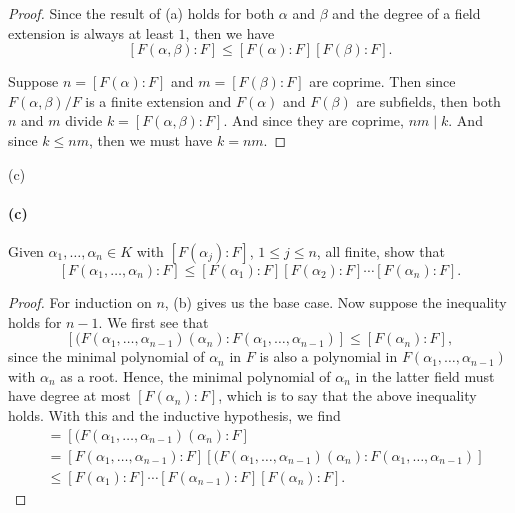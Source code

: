 \documentclass[12pt]{article}
\newenvironment{fullbox}{\begin{lrbox}{\savefullbox}\begin{minipage}{\dimexpr\textwidth-2\fboxsep\relax}}{\end{minipage}\end{lrbox}\begin{center}\framebox[\textwidth]{\usebox{\savefullbox}}\end{center}}
\newenvironment{pbox}[1][]{\begin{fullbox}\ifx#1\empty\else\paragraph{#1}\fi}{\end{fullbox}}
\theoremstyle{definition}
\begin{document}
\begin{proof}
    Since the result of (a) holds for both $\alpha$ and $\beta$ and the degree of a field extension is always at least $1$, then we have
    \[
        [F(\alpha, \beta) : F] \leq [F(\alpha) : F][F(\beta) : F].
    \]

    Suppose $n = [F(\alpha) : F]$ and $m = [F(\beta) : F]$ are coprime. Then since $F(\alpha, \beta)/F$ is a finite extension and $F(\alpha)$ and $F(\beta)$ are subfields, then both $n$ and $m$ divide $k = [F(\alpha, \beta) : F]$. And since they are coprime, $nm \mid k$. And since $k \leq nm$, then we must have $k = nm$.

\end{proof}

\begin{pbox}[(c)]
    Given $\alpha_1, \dots, \alpha_n \in K$ with $[F(\alpha_j) : F]$, $1 \leq j \leq n$, all finite, show that
    \[
        [F(\alpha_1, \dots, \alpha_n) : F] \leq [F(\alpha_1) : F][F(\alpha_2) : F] \cdots [F(\alpha_n) : F].
    \]
\end{pbox}

\begin{proof}
    For induction on $n$, (b) gives us the base case. Now suppose the inequality holds for $n - 1$. We first see that
    \[
        [(F(\alpha_1, \dots, \alpha_{n-1})(\alpha_n) : F(\alpha_1, \dots, \alpha_{n-1})] \leq [F(\alpha_n) : F],
    \]
    since the minimal polynomial of $\alpha_n$ in $F$ is also a polynomial in $F(\alpha_1, \dots, \alpha_{n-1})$ with $\alpha_n$ as a root. Hence, the minimal polynomial of $\alpha_n$ in the latter field must have degree at most $[F(\alpha_n) : F]$, which is to say that the above inequality holds. With this and the inductive hypothesis, we find
    \begin{align*}
        [F(\alpha_1, \dots, \alpha_n) : F]
            &= [(F(\alpha_1, \dots, \alpha_{n-1})(\alpha_n) : F] \\
            &= [F(\alpha_1, \dots, \alpha_{n-1}) : F][(F(\alpha_1, \dots, \alpha_{n-1})(\alpha_n) : F(\alpha_1, \dots, \alpha_{n-1})] \\
            &\leq [F(\alpha_1) : F] \cdots [F(\alpha_{n-1}) : F][F(\alpha_n) : F].
    \end{align*}
    
\end{proof}
\end{document}
